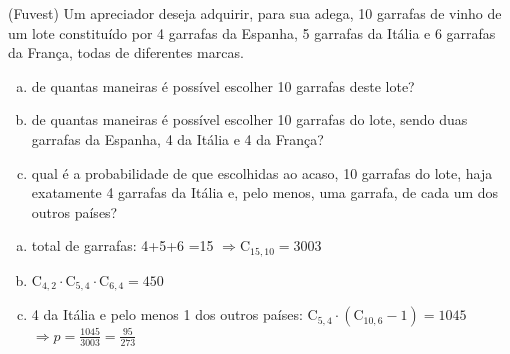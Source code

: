 \begin{ex}
(Fuvest) Um apreciador deseja adquirir, para sua adega, 10 garrafas de vinho de um lote constituído por 4 garrafas da Espanha, 5 garrafas da Itália e 6 garrafas da França, todas de diferentes marcas.
   \begin{enumerate}[(a)]
   \item  de quantas maneiras é possível escolher 10 garrafas deste lote?
   \item de quantas maneiras é possível escolher 10 garrafas do lote, sendo duas garrafas da Espanha, 4 da Itália e 4 da França?
   \item qual é a probabilidade de que escolhidas ao acaso, 10 garrafas do lote, haja exatamente 4 garrafas da Itália e, pelo menos, uma garrafa, de cada  um dos outros países?
   \end{enumerate}
     \begin{sol}
       \phantom{A}
       \begin{enumerate} [(a)]
           \item total de garrafas: 4+5+6 =15  $\Longrightarrow \mathrm{C}_{{15},{10}}=3003$
           \item $\mathrm{C}_{4,2}\cdot\mathrm{C}_{5,4}\cdot\mathrm{C}_{6,4}=450$
           \item 
            4 da Itália e pelo menos 1 dos outros países: $\mathrm{C}_{5,4}\cdot(\mathrm{C}_{{10},6}-1)=1045$ \\
           $ \Longrightarrow p=\frac{1045}{3003}=\frac{95}{273}$
       \end{enumerate}
     \end{sol}
     
\end{ex}